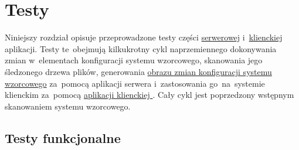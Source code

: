 \documentclass[thesis]{subfiles}
\begin{document}
\chapter{Testy}

Niniejszy rozdział opisuje przeprowadzone testy części \hyperref[sec:srv-app]{serwerowej} i~\hyperref[sec:cli-app]{klienckiej} aplikacji. Testy te~obejmują kilkukrotny cykl naprzemiennego dokonywania zmian w~elementach konfiguracji systemu wzorcowego, skanowania jego śledzonego drzewa plików, generowania \hyperref[sec:obraz-zmian-konfiguracji]{obrazu zmian konfiguracji systemu wzorcowego} za~pomocą aplikacji serwera \hyperref[sec:srv-app]{\texttt{\srvappname{}}} i~zastosowania go~na~systemie klienckim za~pomocą \hyperref[sec:cli-app]{aplikacji klienckiej \texttt{\cliappname{}}}. Cały cykl jest poprzedzony wstępnym skanowaniem systemu wzorcowego.


\section{Testy funkcjonalne}
\end{document}
